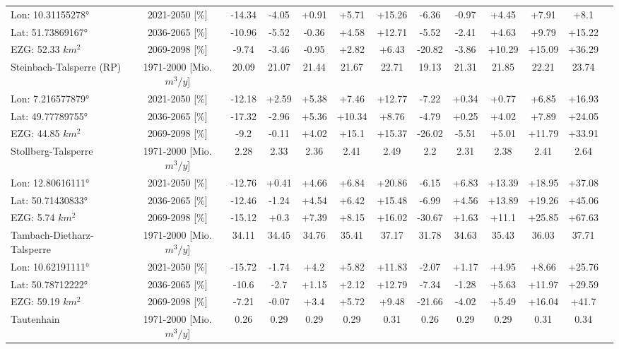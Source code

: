 \begin{longtable}{@{\extracolsep{\fill}}lc|ccccc||cccccc}
\cline{2-13} 
Lon: 10.31155278° & 2021-2050 [\%]  & -14.34 & -4.05 & +0.91 & +5.71 & +15.26 & -6.36 & -0.97 & +4.45 & +7.91 & +8.1 & \\ 
Lat: 51.73869167° & 2036-2065 [\%]  & -10.96 & -5.52 & -0.36 & +4.58 & +12.71 & -5.52 & -2.41 & +4.63 & +9.79 & +15.22 & \\ 
EZG: 52.33 $km^2$ & 2069-2098 [\%]  & -9.74 & -3.46 & -0.95 & +2.82 & +6.43 & -20.82 & -3.86 & +10.29 & +15.09 & +36.29 & \\ 
\hline 
Steinbach-Talsperre (RP) & 1971-2000 [Mio. $m^3/y$]  & 20.09 & 21.07 & 21.44 & 21.67 & 22.71 & 19.13 & 21.31 & 21.85 & 22.21 & 23.74 & \\ 
\cline{2-13} 
Lon: 7.216577879° & 2021-2050 [\%]  & -12.18 & +2.59 & +5.38 & +7.46 & +12.77 & -7.22 & +0.34 & +0.77 & +6.85 & +16.93 & \\ 
Lat: 49.77789755° & 2036-2065 [\%]  & -17.32 & -2.96 & +5.36 & +10.34 & +8.76 & -4.79 & +0.25 & +4.02 & +7.89 & +24.05 & \\ 
EZG: 44.85 $km^2$ & 2069-2098 [\%]  & -9.2 & -0.11 & +4.02 & +15.1 & +15.37 & -26.02 & -5.51 & +5.01 & +11.79 & +33.91 & \\ 
\hline 
Stollberg-Talsperre & 1971-2000 [Mio. $m^3/y$]  & 2.28 & 2.33 & 2.36 & 2.41 & 2.49 & 2.2 & 2.31 & 2.38 & 2.41 & 2.64 & \\ 
\cline{2-13} 
Lon: 12.80616111° & 2021-2050 [\%]  & -12.76 & +0.41 & +4.66 & +6.84 & +20.86 & -6.15 & +6.83 & +13.39 & +18.95 & +37.08 & \\ 
Lat: 50.71430833° & 2036-2065 [\%]  & -12.46 & -1.24 & +4.54 & +6.42 & +15.48 & -6.99 & +4.56 & +13.89 & +19.26 & +45.06 & \\ 
EZG: 5.74 $km^2$ & 2069-2098 [\%]  & -15.12 & +0.3 & +7.39 & +8.15 & +16.02 & -30.67 & +1.63 & +11.1 & +25.85 & +67.63 & \\ 
\hline 
Tambach-Dietharz-Talsperre & 1971-2000 [Mio. $m^3/y$]  & 34.11 & 34.45 & 34.76 & 35.41 & 37.17 & 31.78 & 34.63 & 35.43 & 36.03 & 37.71 & \\ 
\cline{2-13} 
Lon: 10.62191111° & 2021-2050 [\%]  & -15.72 & -1.74 & +4.2 & +5.82 & +11.83 & -2.07 & +1.17 & +4.95 & +8.66 & +25.76 & \\ 
Lat: 50.78712222° & 2036-2065 [\%]  & -10.6 & -2.7 & +1.15 & +2.12 & +12.79 & -7.34 & -1.28 & +5.63 & +11.97 & +29.59 & \\ 
EZG: 59.19 $km^2$ & 2069-2098 [\%]  & -7.21 & -0.07 & +3.4 & +5.72 & +9.48 & -21.66 & -4.02 & +5.49 & +16.04 & +41.7 & \\ 
\hline 
Tautenhain & 1971-2000 [Mio. $m^3/y$]  & 0.26 & 0.29 & 0.29 & 0.29 & 0.31 & 0.26 & 0.29 & 0.29 & 0.31 & 0.34 & \\ 

\end{longtable}
